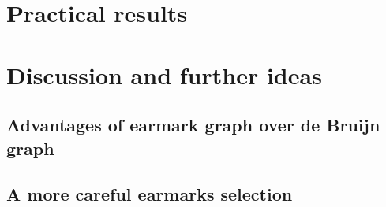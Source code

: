 \documentclass[12pt]{article}
\begin{document}
\section{Practical results}


\section{Discussion and further ideas}

\subsection{Advantages of earmark graph over de Bruijn graph}

\subsection{A more careful earmarks selection}




\end{document}
